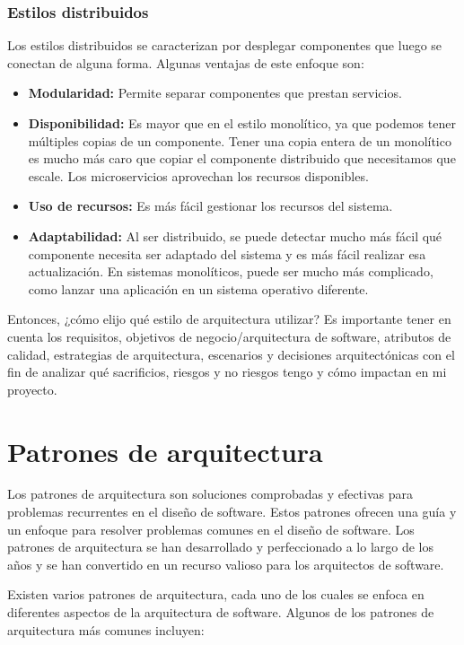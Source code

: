 \documentclass[executivepaper]{article}
\begin{document}
\subsubsection*{Estilos distribuidos}

Los estilos distribuidos se caracterizan por desplegar componentes que luego se conectan de alguna forma. Algunas ventajas de este enfoque son:

\begin{itemize}
\item \textbf{Modularidad:} Permite separar componentes que prestan servicios.
\item \textbf{Disponibilidad:} Es mayor que en el estilo monolítico, ya que podemos tener múltiples copias de un componente. Tener una copia entera de un monolítico es mucho más caro que copiar el componente distribuido que necesitamos que escale. Los microservicios aprovechan los recursos disponibles.
\item \textbf{Uso de recursos:} Es más fácil gestionar los recursos del sistema.
\item \textbf{Adaptabilidad:} Al ser distribuido, se puede detectar mucho más fácil qué componente necesita ser adaptado del sistema y es más fácil realizar esa actualización. En sistemas monolíticos, puede ser mucho más complicado, como lanzar una aplicación en un sistema operativo diferente.
\end{itemize}

Entonces, ¿cómo elijo qué estilo de arquitectura utilizar? Es importante tener en cuenta los requisitos, objetivos de negocio/arquitectura de software, atributos de calidad, estrategias de arquitectura, escenarios y decisiones arquitectónicas con el fin de analizar qué sacrificios, riesgos y no riesgos tengo y cómo impactan en mi proyecto.

\newpage
\section{Patrones de arquitectura}
Los patrones de arquitectura son soluciones comprobadas y efectivas para problemas recurrentes en el diseño de software. Estos patrones ofrecen una guía y un enfoque para resolver problemas comunes en el diseño de software. Los patrones de arquitectura se han desarrollado y perfeccionado a lo largo de los años y se han convertido en un recurso valioso para los arquitectos de software.

Existen varios patrones de arquitectura, cada uno de los cuales se enfoca en diferentes aspectos de la arquitectura de software. Algunos de los patrones de arquitectura más comunes incluyen:
\end{document}
